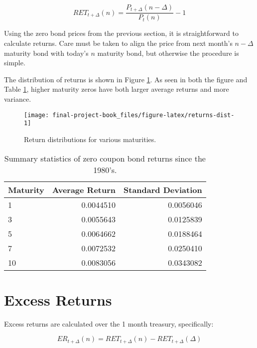 \documentclass[openany]{book}
\theoremstyle{definition}
\theoremstyle{definition}
\theoremstyle{definition}
\theoremstyle{remark}
\begin{document}
\[ RET_{t+\Delta}(n) = \frac{P_{t+\Delta}(n - \Delta)}{P_t(n)} - 1 \]

Using the zero bond prices from the previous section, it is
straightforward to calculate returns. Care must be taken to align the
price from next month's \(n-\Delta\) maturity bond with today's \(n\)
maturity bond, but otherwise the procedure is simple.

The distribution of returns is shown in Figure \ref{fig:returns-dist}.
As seen in both the figure and Table \ref{tab:returns-summary}, higher
maturity zeros have both larger average returns and more variance.

\small

\begin{figure}[H]

{\centering \texttt{[image: final-project-book\_files/figure-latex/returns-dist-1]} 

}

\caption{Return distributions for various maturities.}\label{fig:returns-dist}
\end{figure}

\normalsize

\small

\begin{table}[H]

\caption{\label{tab:returns-summary}Summary statistics of zero coupon bond returns since the 1980's.}
\centering
\begin{tabular}[t]{lrr}
\toprule
Maturity & Average Return & Standard Deviation\\
\midrule
1 & 0.0044510 & 0.0056046\\
3 & 0.0055643 & 0.0125839\\
5 & 0.0064662 & 0.0188464\\
7 & 0.0072532 & 0.0250410\\
10 & 0.0083056 & 0.0343082\\
\bottomrule
\end{tabular}
\end{table}

\normalsize

\hypertarget{excess-returns}{%
\section{Excess Returns}\label{excess-returns}}

Excess returns are calculated over the 1 month treasury, specifically:

\[ ER_{t+\Delta}(n) = RET_{t+\Delta}(n) - RET_{t+\Delta}(\Delta) \]
\end{document}

